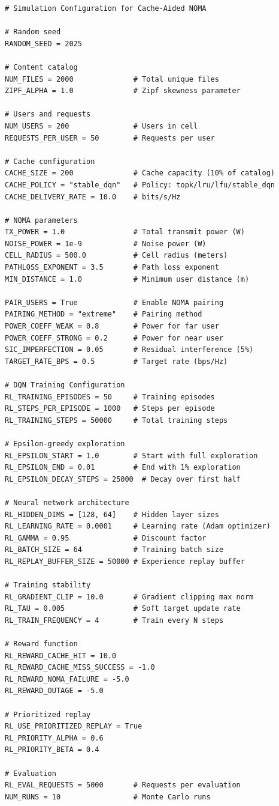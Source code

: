 \documentclass[12pt,a4paper]{article}
\begin{document}
\begin{verbatim}
# Simulation Configuration for Cache-Aided NOMA

# Random seed
RANDOM_SEED = 2025

# Content catalog
NUM_FILES = 2000              # Total unique files
ZIPF_ALPHA = 1.0              # Zipf skewness parameter

# Users and requests
NUM_USERS = 200               # Users in cell
REQUESTS_PER_USER = 50        # Requests per user

# Cache configuration
CACHE_SIZE = 200              # Cache capacity (10% of catalog)
CACHE_POLICY = "stable_dqn"   # Policy: topk/lru/lfu/stable_dqn
CACHE_DELIVERY_RATE = 10.0    # bits/s/Hz

# NOMA parameters
TX_POWER = 1.0                # Total transmit power (W)
NOISE_POWER = 1e-9            # Noise power (W)
CELL_RADIUS = 500.0           # Cell radius (meters)
PATHLOSS_EXPONENT = 3.5       # Path loss exponent
MIN_DISTANCE = 1.0            # Minimum user distance (m)

PAIR_USERS = True             # Enable NOMA pairing
PAIRING_METHOD = "extreme"    # Pairing method
POWER_COEFF_WEAK = 0.8        # Power for far user
POWER_COEFF_STRONG = 0.2      # Power for near user
SIC_IMPERFECTION = 0.05       # Residual interference (5%)
TARGET_RATE_BPS = 0.5         # Target rate (bps/Hz)

# DQN Training Configuration
RL_TRAINING_EPISODES = 50     # Training episodes
RL_STEPS_PER_EPISODE = 1000   # Steps per episode
RL_TRAINING_STEPS = 50000     # Total training steps

# Epsilon-greedy exploration
RL_EPSILON_START = 1.0        # Start with full exploration
RL_EPSILON_END = 0.01         # End with 1% exploration
RL_EPSILON_DECAY_STEPS = 25000  # Decay over first half

# Neural network architecture
RL_HIDDEN_DIMS = [128, 64]    # Hidden layer sizes
RL_LEARNING_RATE = 0.0001     # Learning rate (Adam optimizer)
RL_GAMMA = 0.95               # Discount factor
RL_BATCH_SIZE = 64            # Training batch size
RL_REPLAY_BUFFER_SIZE = 50000 # Experience replay buffer

# Training stability
RL_GRADIENT_CLIP = 10.0       # Gradient clipping max norm
RL_TAU = 0.005                # Soft target update rate
RL_TRAIN_FREQUENCY = 4        # Train every N steps

# Reward function
RL_REWARD_CACHE_HIT = 10.0
RL_REWARD_CACHE_MISS_SUCCESS = -1.0
RL_REWARD_NOMA_FAILURE = -5.0
RL_REWARD_OUTAGE = -5.0

# Prioritized replay
RL_USE_PRIORITIZED_REPLAY = True
RL_PRIORITY_ALPHA = 0.6
RL_PRIORITY_BETA = 0.4

# Evaluation
RL_EVAL_REQUESTS = 5000       # Requests per evaluation
NUM_RUNS = 10                 # Monte Carlo runs
\end{verbatim}
\end{document}
